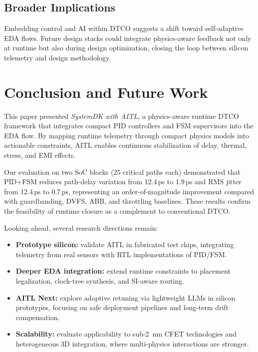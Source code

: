 \documentclass[conference]{IEEEtran}
\begin{document}
\subsection{Broader Implications}
Embedding control and AI within DTCO suggests a shift toward self-adaptive EDA flows. Future design stacks could integrate physics-aware feedback not only at runtime but also during design optimization, closing the loop between silicon telemetry and design methodology.

\section{Conclusion and Future Work}

This paper presented \emph{SystemDK with AITL}, a physics-aware runtime DTCO framework that integrates compact PID controllers and FSM supervisors into the EDA flow. By mapping runtime telemetry through compact physics models into actionable constraints, AITL enables continuous stabilization of delay, thermal, stress, and EMI effects. 

Our evaluation on two SoC blocks (25 critical paths each) demonstrated that PID+FSM reduces path-delay variation from 12.4\,ps to 1.9\,ps and RMS jitter from 12.4\,ps to 0.7\,ps, representing an order-of-magnitude improvement compared with guardbanding, DVFS, ABB, and throttling baselines. These results confirm the feasibility of runtime closure as a complement to conventional DTCO.

Looking ahead, several research directions remain:
\begin{itemize}
  \item \textbf{Prototype silicon:} validate AITL in fabricated test chips, integrating telemetry from real sensors with RTL implementations of PID/FSM.
  \item \textbf{Deeper EDA integration:} extend runtime constraints to placement legalization, clock-tree synthesis, and SI-aware routing.
  \item \textbf{AITL Next:} explore adaptive retuning via lightweight LLMs in silicon prototypes, focusing on safe deployment pipelines and long-term drift compensation.
  \item \textbf{Scalability:} evaluate applicability to sub-\SI{2}{\nano\meter} CFET technologies and heterogeneous 3D integration, where multi-physics interactions are stronger.
\end{itemize}
\end{document}
